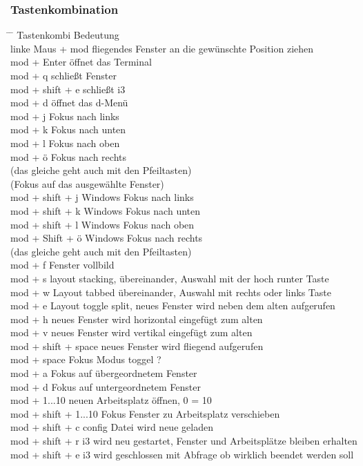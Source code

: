\documentclass[10pt,a4paper,twoside]{book}
\begin{document}
\subsubsection{Tastenkombination}
\begin{tabbing}
\hspace*{1mm} \=\hspace*{30mm} \= \kill
\> Tastenkombi \> Bedeutung  \\
\> linke Maus + mod \> fliegendes Fenster an die gewünschte Position ziehen\\
\> mod + Enter \> öffnet das Terminal\\
\> mod + q \> schließt Fenster\\
\> mod + shift + e \> schließt i3\\
\> mod + d \> öffnet das d-Menü\\
\> mod + j \> Fokus nach links\\
\> mod + k \> Fokus nach unten\\
\> mod + l \> Fokus nach oben\\
\> mod + ö \> Fokus nach rechts\\
(das gleiche geht auch mit den Pfeiltasten)\\
(Fokus auf das ausgewählte Fenster)\\
\> mod + shift + j \> Windows Fokus nach links\\
\> mod + shift + k \> Windows Fokus nach unten\\
\> mod + shift + l \> Windows Fokus nach oben\\
\> mod + Shift + ö \> Windows Fokus nach rechts\\
(das gleiche geht auch mit den Pfeiltasten)\\
\> mod + f \> Fenster vollbild\\
\> mod + s \> layout stacking, übereinander, Auswahl mit der hoch runter Taste\\
\> mod + w \> Layout tabbed übereinander, Auswahl mit rechts oder links Taste\\
\> mod + e \> Layout toggle split, neues Fenster wird neben dem alten aufgerufen\\
\> mod + h \> neues Fenster wird horizontal eingefügt zum alten\\
\> mod + v \> neues Fenster wird vertikal eingefügt zum alten\\
\> mod + shift + space \> neues Fenster wird fliegend aufgerufen\\
\> mod + space \> Fokus Modus toggel ?\\
\> mod + a \> Fokus auf übergeordnetem Fenster\\
\> mod + d \> Fokus auf untergeordnetem Fenster\\
\> mod + 1...10 \> neuen Arbeitsplatz öffnen, 0 = 10\\
\> mod + shift + 1...10 \> Fokus Fenster zu Arbeitsplatz verschieben\\
\> mod + shift + c \> config Datei wird neue geladen\\
\> mod + shift + r \> i3 wird neu gestartet, Fenster und Arbeitsplätze bleiben erhalten\\
\> mod + shift + e \> i3 wird geschlossen mit Abfrage ob wirklich beendet werden soll\\
\end{tabbing}
\end{document}
